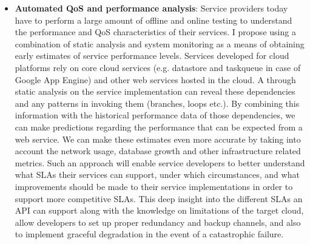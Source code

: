 \begin{itemize}
\item {\bf Automated QoS and performance analysis}: Service providers today have to perform
a large amount of offline and online testing to understand the performance and QoS characteristics
of their services. I propose using a combination of static analysis and system monitoring as a 
means of obtaining early estimates of service performance levels. Services developed for cloud
platforms rely on core cloud services (e.g. datastore and taskqueue in case of Google App Engine)
and other web services hosted
in the cloud. A through static analysis on the service implementation can reveal these dependencies
and any patterns in invoking them (branches, loops etc.). By combining this information with the
historical performance data of those dependencies, we can make predictions regarding
the performance that can be expected from a web service. We can make these estimates even
more accurate by taking into account the network usage, database growth and other infrastructure
related metrics. Such an approach will enable service developers to better understand what SLAs their
services can support, under which circumstances, and what improvements should be made to their 
service implementations
in order to support more competitive SLAs. This deep insight into the different SLAs
an API can support along with the knowledge on limitations of the target cloud, allow developers
to set up proper redundancy and backup channels, and also to implement graceful degradation
in the event of a catastrophic failure. 

\end{itemize}


